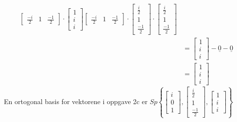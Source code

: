 \documentclass[11pt, a4paper, norsk]{NTNUoving}
\begin{document}
\begin{oppgave}
\begin{punkt}
\begin{align*}
{\begin{bmatrix}
                        \frac{-i}{2} & 1 & \frac{-1}{2}
                    \end{bmatrix} \cdot \begin{bmatrix}
                        1 \\
                        i \\
                        i
                    \end{bmatrix}}{\begin{bmatrix}
                        \frac{-i}{2} & 1 & \frac{-1}{2}
                    \end{bmatrix} \cdot \begin{bmatrix}
                        \frac{i}{2} \\
                        1 \\
                        \frac{-1}{2}
                    \end{bmatrix}} \cdot \begin{bmatrix}
                        \frac{i}{2} \\
                        1 \\
                        \frac{-1}{2}
                    \end{bmatrix}
                    \\
                                    &= \begin{bmatrix}
                                        1 \\
                                        i \\
                                        i
                                    \end{bmatrix} - \underline{0} - \underline{0}
                                    \\
                                    &= \begin{bmatrix}
                                        1 \\
                                        i \\
                                        i
                                    \end{bmatrix}
            \end{align*}
            En ortogonal basis for vektorene i oppgave 2c er $Sp\left\{\begin{bmatrix}
                i \\
                0 \\
                1
            \end{bmatrix}, \begin{bmatrix}
                \frac{i}{2} \\
                1 \\
                \frac{-1}{2}
            \end{bmatrix}, \begin{bmatrix}
                1 \\
                i \\
                i
            \end{bmatrix}\right\}$
       \end{punkt}
   \end{oppgave}
\end{document}
